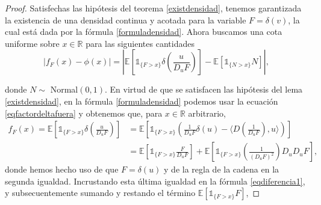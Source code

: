 \documentclass[letterpaper,twoside,12pt]{book}
\newcommand{\R}{\mathbb{R}}
\newcommand{\E}{\mathbb{E}}
\newcommand{\1}{\mathds{1}}
\newcommand{\abs}[1]{\left\lvert #1 \right\rvert}
\theoremstyle{definition}
\theoremstyle{definition}
\theoremstyle{remark}
\theoremstyle{definition}
\theoremstyle{definition}
\theoremstyle{definition}
\theoremstyle{definition}
\theoremstyle{definition}
\begin{document}
\begin{proof}
   Satisfechas las hipótesis del teorema \ref{existdensidad}, tenemos garantizada la existencia de una densidad continua y acotada para la variable $F=\delta(v)$, la cual está dada por la fórmula \eqref{formuladensidad}. Ahora buscamos una cota uniforme sobre $x\in \R$ para las siguientes cantidades
   \begin{equation}\label{eqdiferencia1}
   \abs{f_F(x)-\phi(x)}=\abs{\E\left[\1_{\{F>x\}}\delta\left(\frac{u}{D_uF}\right)\right]-\E\left[\1_{\{N>x\}}N\right]}, 
   \end{equation}
  
  donde $N\sim$ Normal$(0,1)$.
   En virtud de que se satisfacen las hipótesis del lema \ref{existdensidad}, en la fórmula \eqref{formuladensidad} podemos usar la ecuación \eqref{eqfactordeltafuera} y obtenemos que, para $x\in \R$ arbitrario,
   \begin{align*}
   f_F(x)=\E\left[\1_{\{F>x\}}\delta\left(\frac{u}{D_uF}\right)\right]&=\E\left[\1_{\{F>x\}}\left(\frac{1}{D_{u}F}\delta(u)-\Big\langle D \left(\frac{1}{D_{u}F}\right),u \Big\rangle \right)\right]\\
   &=\E\left[\1_{\{F>x\}}\frac{F}{D_{u}F}\right]+\E\left[\1_{\{F>x\}}\left(\frac{1}{\left(D_{u}F\right)^2}\right)D_{u}D_{u}F\right],
      \end{align*}
      donde hemos hecho uso de que $F=\delta(u)$ y de la regla de la cadena en la segunda igualdad.
  Incrustando esta última igualdad en la fórmula \eqref{eqdiferencia1}, y subsecuentemente sumando y restando el término $\E\left[\1_{\{F>x\}}F\right]$,
  

\end{proof}
\end{document}
